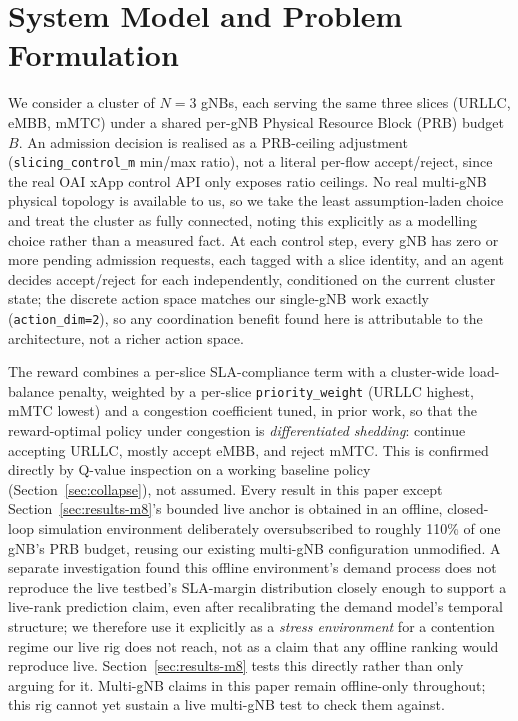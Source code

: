 \documentclass[pdflatex,sn-basic,Numbered]{sn-jnl}%
\begin{document}
\section{System Model and Problem Formulation}
\label{sec:system-model}
We consider a cluster of $N{=}3$ gNBs, each serving the same three
slices (URLLC, eMBB, mMTC) under a shared per-gNB Physical Resource
Block (PRB) budget $B$. An admission decision is realised as a
PRB-ceiling adjustment (\texttt{slicing\_control\_m} min/max ratio),
not a literal per-flow accept/reject, since the real OAI xApp control
API only exposes ratio ceilings. No real multi-gNB physical topology is
available to us, so we take the least assumption-laden choice and
treat the cluster as fully connected, noting this explicitly as a
modelling choice rather than a measured fact. At each control step,
every gNB has zero or more pending admission requests, each tagged
with a slice identity, and an agent decides accept/reject for each
independently, conditioned on the current cluster state; the discrete
action space matches our single-gNB work exactly
(\texttt{action\_dim=2}), so any coordination benefit found here is
attributable to the architecture, not a richer action space.

The reward combines a per-slice SLA-compliance term with a
cluster-wide load-balance penalty, weighted by a per-slice
\texttt{priority\_weight} (URLLC highest, mMTC lowest) and a congestion
coefficient tuned, in prior work, so that the reward-optimal policy
under congestion is \emph{differentiated shedding}: continue accepting
URLLC, mostly accept eMBB, and reject mMTC. This is confirmed directly by Q-value inspection on a working baseline policy (Section~\ref{sec:collapse}), not assumed. Every result in this paper
except Section~\ref{sec:results-m8}'s bounded live anchor is obtained
in an offline, closed-loop simulation environment deliberately
oversubscribed to roughly 110\% of one gNB's PRB budget, reusing our
existing multi-gNB configuration unmodified. A separate investigation
found this offline environment's demand process does not reproduce the
live testbed's SLA-margin distribution closely enough to support a
live-rank prediction claim, even after recalibrating the demand
model's temporal structure; we therefore use it explicitly as a \emph{stress environment} for a contention regime our live rig does not reach, not as a claim that any offline ranking would reproduce live. Section~\ref{sec:results-m8} tests this directly rather than only arguing for it. Multi-gNB claims in this paper remain
offline-only throughout; this rig cannot yet sustain a live multi-gNB
test to check them against.
\end{document}
